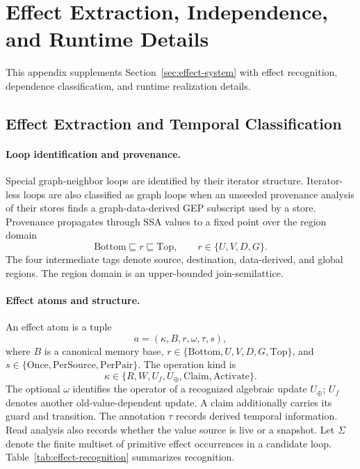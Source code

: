 
\section{Effect Extraction, Independence, and Runtime Details}
\label{app:effects}
This appendix supplements Section~\ref{sec:effect-system} with effect recognition,
dependence classification, and runtime realization details.

\subsection{Effect Extraction and Temporal Classification}
\label{app:effects-extraction}
\paragraph{Loop identification and provenance.}
Special graph-neighbor loops are identified by their iterator structure.
Iterator-less loops are also classified as graph loops when an unseeded
provenance analysis of their stores finds a graph-data-derived GEP
subscript used by a store. Provenance propagates through SSA values to a
fixed point over the region domain
\[
\mathrm{Bottom}\sqsubseteq r\sqsubseteq\mathrm{Top},
\qquad r\in\{U,V,D,G\}.
\]
The four intermediate tags denote source, destination, data-derived, and
global regions. The region domain is an upper-bounded join-semilattice.

\paragraph{Effect atoms and structure.}
An effect atom is a tuple
\[
a=(\kappa,B,r,\omega,\tau,s),
\]
where $B$ is a canonical memory base,
$r\in\{\mathrm{Bottom},U,V,D,G,\mathrm{Top}\}$, and
$s\in\{\mathrm{Once},\mathrm{PerSource},\mathrm{PerPair}\}$.
The operation kind is
\[
\kappa\in\{R,W,U_f,U_{\oplus},\mathrm{Claim},\mathrm{Activate}\}.
\]
The optional $\omega$ identifies the operator of a recognized algebraic
update $U_{\oplus}$; $U_f$ denotes another old-value-dependent update.
A claim additionally carries its guard and transition. The annotation
$\tau$ records derived temporal information. Read analysis also records
whether the value source is live or a snapshot. Let $\Sigma$ denote the
finite multiset of primitive effect occurrences in a candidate loop.
Table~\ref{tab:effect-recognition} summarizes recognition.

